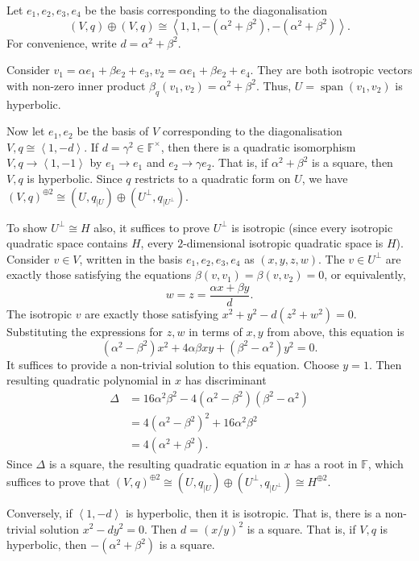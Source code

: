 \documentclass[12 pt, letterpaper]{hmcpset}
\begin{document}
\begin{solution}
	Let $e_{1}, e_{2}, e_{3}, e_{4}$ be the basis corresponding to the diagonalisation
	\[
		(V, q) \oplus (V, q) \cong \left < 1, 1, -(\alpha^{2} + \beta^{2}), -(\alpha^{2} + \beta^{2}) \right >.
	\]
	For convenience, write $d = \alpha^{2} + \beta^{2}$.

	Consider $v_{1} = \alpha e_{1} + \beta e_{2} + e_{3}, v_{2} = \alpha e_{1} + \beta e_{2} + e_{4}$. They are both isotropic vectors with non-zero inner product $\beta_{q}(v_{1}, v_{2}) = \alpha^{2} + \beta^{2}$. Thus, $U = \operatorname{span}(v_{1}, v_{2})$ is hyperbolic.

	Now let $e_{1}, e_{2}$ be the basis of $V$ corresponding to the diagonalisation $V, q \cong \left < 1, -d \right >$. If $d = \gamma^{2} \in \mathbb{F}^{\times}$, then there is a quadratic isomorphism $V, q \to \left < 1, -1 \right >$ by $e_{1} \to e_{1}$ and $e_{2} \to \gamma e_{2}$. That is, if $\alpha^{2} + \beta^{2}$ is a square, then $V, q$ is hyperbolic. Since $q$ restricts to a quadratic form on $U$, we have $(V, q)^{\oplus 2} \cong (U, q_{\mid U}) \oplus (U^{\perp}, q_{\mid U^{\perp}})$. 

	To show $U^{\perp} \cong H$ also, it suffices to prove $U^{\perp}$ is isotropic (since every isotropic quadratic space contains $H$, every $2$-dimensional isotropic quadratic space is $H$). Consider $v \in V$, written in the basis $e_{1}, e_{2}, e_{3}, e_{4}$ as $(x, y, z, w)$. The $v \in U^{\perp}$ are exactly those satisfying the equations $\beta(v, v_{1}) = \beta(v, v_{2}) = 0$, or equivalently,
	\[
		w = z = \frac{\alpha x + \beta y}{d}.
	\]
	The isotropic $v$ are exactly those satisfying $x^{2} + y^{2} - d(z^{2} + w^{2}) = 0$. Substituting the expressions for $z, w$ in terms of $x, y$ from above, this equation is
	\[
		(\alpha^{2} - \beta^{2}) x^{2} + 4 \alpha \beta xy + (\beta^{2} - \alpha^{2}) y^{2} = 0.
	\]
	It suffices to provide a non-trivial solution to this equation. Choose $y = 1$. Then resulting quadratic polynomial in $x$ has discriminant
	\begin{align*}
		\Delta & = 16 \alpha^{2} \beta^{2} - 4 (\alpha^{2} - \beta^{2})(\beta^{2} - \alpha^{2}) \\
		       & = 4 (\alpha^{2} - \beta^{2})^{2} + 16 \alpha^{2} \beta^{2} \\
		       & = 4(\alpha^{2} + \beta^{2}).
	\end{align*}
	Since $\Delta$ is a square, the resulting quadratic equation in $x$ has a root in $\mathbb{F}$, which suffices to prove that $(V, q)^{\oplus 2} \cong (U, q_{\mid U}) \oplus (U^{\perp}, q_{\mid U^{\perp}}) \cong H^{\oplus 2}$.

	Conversely, if $\left < 1, -d \right >$ is hyperbolic, then it is isotropic. That is, there is a non-trivial solution $x^{2} - d y^{2} = 0$. Then $d = (x / y)^{2}$ is a square. That is, if $V, q$ is hyperbolic, then $-(\alpha^{2} + \beta^{2})$ is a square.
\end{solution}
\end{document}
